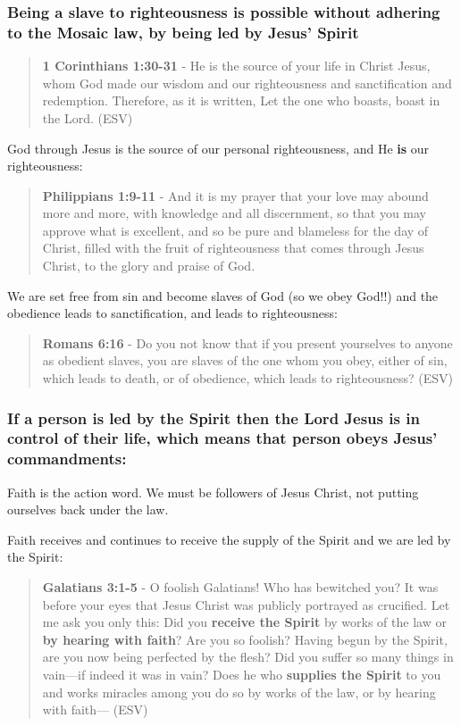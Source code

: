\documentclass[11pt]{article}
\begin{document}
\subsubsection{Being a slave to righteousness is possible without adhering to the Mosaic law, by being led by Jesus' Spirit}
\label{sec:org4f816c6}

\begin{quote}
\textbf{1 Corinthians 1:30-31} -  He is the source of your life in Christ Jesus, whom God made our wisdom and our righteousness and sanctification and redemption.  Therefore, as it is written, Let the one who boasts, boast in the Lord.  (ESV)
\end{quote}

God through Jesus is the source of our personal righteousness, and He \textbf{is} our righteousness:

\begin{quote}
\textbf{Philippians 1:9-11} - And it is my prayer that your love may abound more and more, with knowledge and all discernment, so that you may approve what is excellent, and so be pure and blameless for the day of Christ, filled with the fruit of righteousness that comes through Jesus Christ, to the glory and praise of God.
\end{quote}

We are set free from sin and become slaves of God (so we obey God!!) and the obedience leads to sanctification, and leads to righteousness:

\begin{quote}
\textbf{Romans 6:16} - Do you not know that if you present yourselves to anyone as obedient slaves, you are slaves of the one whom you obey, either of sin, which leads to death, or of obedience, which leads to righteousness? (ESV)
\end{quote}

\subsubsection{If a person is led by the Spirit then the Lord Jesus is in control of their life, which means that person obeys Jesus' commandments:}
\label{sec:org99f8adc}

Faith is the action word. We must be followers of Jesus Christ, not putting ourselves back under the law.

Faith receives and continues to receive the supply of the Spirit and we are led by the Spirit:

\begin{quote}
\textbf{Galatians 3:1-5} - O foolish Galatians! Who has bewitched you? It was before your eyes that Jesus Christ was publicly portrayed as crucified. Let me ask you only this: Did you \textbf{receive the Spirit} by works of the law or \textbf{by hearing with faith}? Are you so foolish? Having begun by the Spirit, are you now being perfected by the flesh? Did you suffer so many things in vain—if indeed it was in vain? Does he who \textbf{supplies the Spirit} to you and works miracles among you do so by works of the law, or by hearing with faith— (ESV)
\end{quote}
\end{document}
